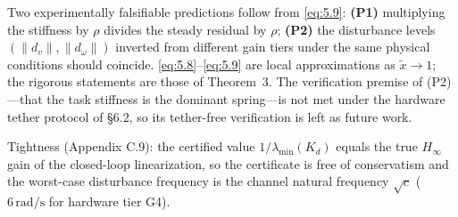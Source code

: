 Two experimentally falsifiable predictions follow from \eqref{eq:5.9}: \textbf{(P1)} multiplying the stiffness by $\rho$ divides the steady residual by $\rho$; \textbf{(P2)} the disturbance levels $(\|d_v\|,\|d_\omega\|)$ inverted from different gain tiers under the same physical conditions should coincide. \eqref{eq:5.8}--\eqref{eq:5.9} are local approximations as $\tilde x\to1$; the rigorous statements are those of Theorem~3. The verification premise of (P2)---that the task stiffness is the dominant spring---is not met under the hardware tether protocol of \S6.2, so its tether-free verification is left as future work.

Tightness (Appendix C.9): the certified value $1/\lambda_{\min}(K_d)$ equals the true $H_\infty$ gain of the closed-loop linearization, so the certificate is free of conservatism and the worst-case disturbance frequency is the channel natural frequency $\sqrt c$ ($6\,\mathrm{rad/s}$ for hardware tier G4).

